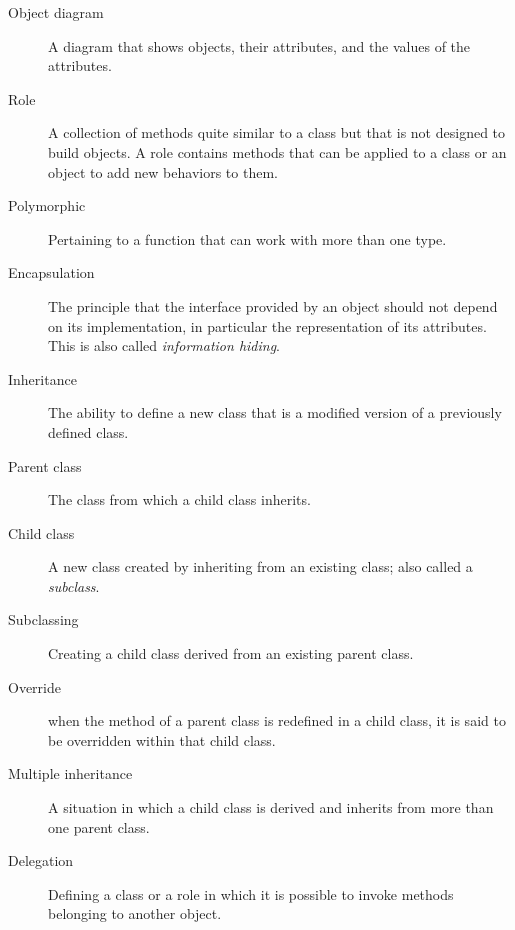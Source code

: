 \begin{description}
\item[Object diagram] A diagram that shows objects, their
attributes, and the values of the attributes.

\item[Role] A collection of methods quite similar to a class but 
that is not designed to build objects. A role contains methods 
that can be applied to a class or an object to add new behaviors 
to them.

\item[Polymorphic] Pertaining to a function that can work with more
  than one type.  

\item[Encapsulation] The principle that the interface provided 
by an object should not depend on its implementation, in particular
the representation of its attributes. This is also called 
\emph{information hiding}.

\item[Inheritance] The ability to define a new class that is a
modified version of a previously defined class.

\item[Parent class] The class from which a child class inherits.

\item[Child class] A new class created by inheriting from an
existing class; also called a \emph{subclass}.

\item[Subclassing] Creating a child class derived from an 
existing parent class.

\item[Override] when the method of a parent class is 
redefined in a child class, it is said to be overridden 
within that child class.

\item[Multiple inheritance] A situation in which a child class 
is derived and inherits from more than one parent class.

\item[Delegation] Defining a class or a role in which it is 
possible to invoke methods belonging to another object.

\end{description}

